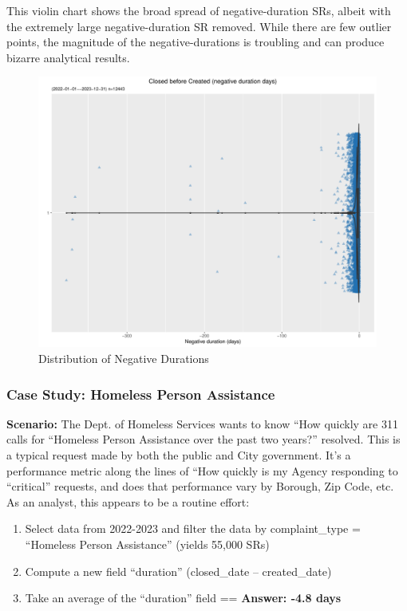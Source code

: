 \documentclass[12pt, titlepage]{article}
\begin{document}
	This violin chart shows the broad spread of negative-duration SRs, albeit with 
	the extremely large negative-duration SR removed. While there are few 
	outlier points, the magnitude of the negative-durations is troubling and can 
	produce bizarre analytical results.
	
	\begin{figure}[tbp]
	 	 \centering
	 	 \includegraphics[width = \textwidth]{negative_duration_SR_violin.pdf}
		 \caption{Distribution of Negative Durations}
		 \label{fig:negative-duration-violin}
	\end{figure}


\subsubsection{Case Study: Homeless Person Assistance}
\label{sec:homlessassistance}
	\textbf{Scenario:} The Dept. of Homeless Services wants to 
	know ``How quickly are 311 calls for ``Homeless Person Assistance 
	over the past two years?'' resolved. This is a typical request made by 
	both the public and City government. It's a performance metric along 
	the lines of ``How quickly is my Agency responding to ``critical'' 
	requests, and does that performance vary by Borough, Zip Code, etc. 
	As an analyst, this appears to be a routine effort: 
		
	\begin{enumerate}
	    \item Select data from 2022-2023 and filter the data by 
	    complaint\_type = ``Homeless Person Assistance'' (yields 55,000 SRs)
	    \item Compute a new field ``duration'' (closed\_date – created\_date)
	    \item Take an average of the ``duration'' field == \textbf{Answer:  -4.8 days}  
	\end{enumerate}
		
\end{document}
